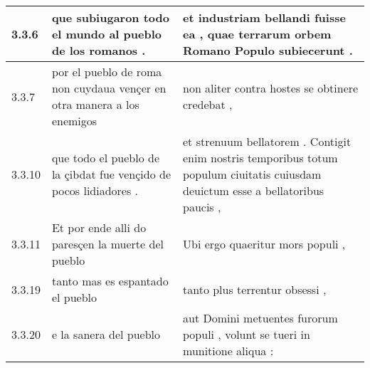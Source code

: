 \begin{tabular}{|p{1cm}|p{6.5cm}|p{6.5cm}|}
3.3.6 & que subiugaron todo el mundo al pueblo de los romanos . & et industriam bellandi fuisse ea , quae terrarum orbem Romano Populo subiecerunt . \\\hline
3.3.7 & por el pueblo de roma non cuydaua vençer en otra manera a los enemigos & non aliter contra hostes se obtinere credebat , \\\hline
3.3.10 & que todo el pueblo de la çibdat fue vençido de pocos lidiadores . & et strenuum bellatorem . Contigit enim nostris temporibus totum populum ciuitatis cuiusdam deuictum esse a bellatoribus paucis , \\\hline
3.3.11 & Et por ende alli do paresçen la muerte del pueblo & Ubi ergo quaeritur mors populi , \\\hline
3.3.19 & tanto mas es espantado el pueblo & tanto plus terrentur obsessi , \\\hline
3.3.20 & e la sanera del pueblo & aut Domini metuentes furorum populi , volunt se tueri in munitione aliqua : \\\hline

\end{tabular}
